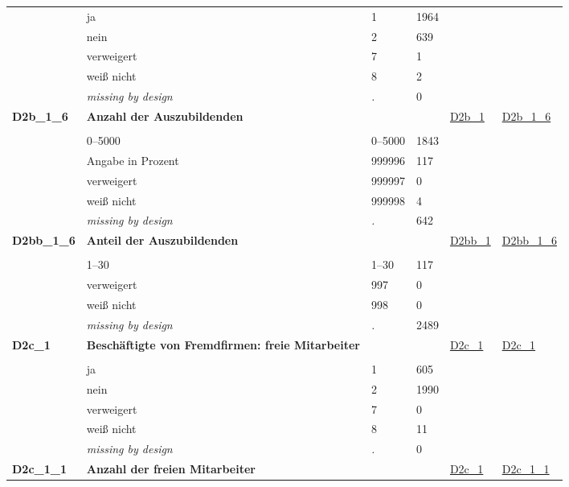 \begin{longtable}{| L{2.45cm} | L{6cm} | C{1.5cm} | R{1cm} | C{2.25cm} | C{2.25cm} |}
   & ja & 1 & 1964 &  &  \\ 
   & nein & 2 & 639 &  &  \\ 
   & verweigert & 7 & 1 &  &  \\ 
   & weiß nicht & 8 & 2 &  &  \\ 
   & \textit{missing by design} & \textit{.} & 0 &  &  \\ 
   \midrule
\textbf{D2b\_1\_6}\label{var:D2b:1:6} & \textbf{Anzahl der Auszubildenden} &  &  & \hyperref[D2b:1]{D2b\_1} & \hyperref[var:suf:D2b:1:6]{D2b\_1\_6} \\ 
   &  &  &  &  &  \\ 
   & 0--5000 & 0--5000 & 1843 &  &  \\ 
   & Angabe in Prozent & 999996 & 117 &  &  \\ 
   & verweigert & 999997 & 0 &  &  \\ 
   & weiß nicht & 999998 & 4 &  &  \\ 
   & \textit{missing by design} & \textit{.} & 642 &  &  \\ 
   \midrule
\textbf{D2bb\_1\_6}\label{var:D2bb:1:6} & \textbf{Anteil der Auszubildenden} &  &  & \hyperref[D2bb:1]{D2bb\_1} & \hyperref[var:suf:D2bb:1:6]{D2bb\_1\_6} \\ 
   &  &  &  &  &  \\ 
   & 1--30 & 1--30 & 117 &  &  \\ 
   & verweigert & 997 & 0 &  &  \\ 
   & weiß nicht & 998 & 0 &  &  \\ 
   & \textit{missing by design} & \textit{.} & 2489 &  &  \\ 
   \midrule
\textbf{D2c\_1}\label{var:D2c:1} & \textbf{Beschäftigte von Fremdfirmen: freie Mitarbeiter} &  &  & \hyperref[D2c:1]{D2c\_1} & \hyperref[var:suf:D2c:1]{D2c\_1} \\ 
   &  &  &  &  &  \\ 
   & ja & 1 & 605 &  &  \\ 
   & nein & 2 & 1990 &  &  \\ 
   & verweigert & 7 & 0 &  &  \\ 
   & weiß nicht & 8 & 11 &  &  \\ 
   & \textit{missing by design} & \textit{.} & 0 &  &  \\ 
   \midrule
\textbf{D2c\_1\_1}\label{var:D2c:1:1} & \textbf{Anzahl der freien Mitarbeiter} &  &  & \hyperref[D2c:1]{D2c\_1} & \hyperref[var:suf:D2c:1:1]{D2c\_1\_1} \\ 

\end{longtable}
